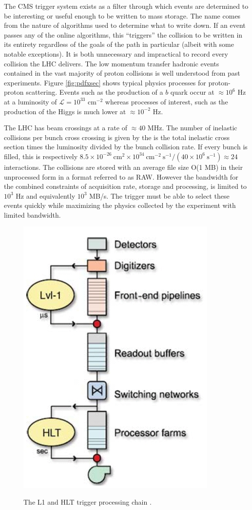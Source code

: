 The CMS trigger system exists as a filter through which events are determined to be interesting or 
useful enough to be written to mass storage. The name comes from the nature of algorithms used to determine 
what to write down. If an event passes any of the online algorithms, this ``triggers'' the collision to be 
written in its entirety regardless of the goals of the path in particular 
 (albeit with some notable exceptions). It is both  unnecessary and impractical to record every
collision the LHC delivers. The low momentum transfer  hadronic events contained in the vast majority of
 proton collisions is well understood from past experiments. Figure \ref{fig:pdfxsec}  shows 
typical physics processes for proton-proton scattering. Events such as the production 
of a $b$ quark  occur at $\approx 10^6$ Hz at a luminosity of $\mathcal{L} = 10^{33}$ cm$^{-2}$ 
whereas processes of interest, such as the production of the Higgs is much lower at $\approx 10^{-2}$ Hz.  

The LHC has beam crossings at a rate of $\approx 40$ MHz. The number of inelastic collisions per bunch cross crossing
 is given by the  is the total inelastic cross section times the luminosity divided by the bunch collision rate. If every bunch is filled, this 
is respectively $8.5\times 10^{-26}~\text{cm}^2 \times 10^{34}~\text{cm}^{-2}~\text{s}^{-1}/ (40 \times 10^6~\text{s}^{-1}) \approx 24$ interactions.
The collisions are stored with an average file size O(1 MB) in their unprocessed 
form in a format referred to as RAW. However the bandwidth for the combined constraints of
 acquisition rate, storage and processing, is limited to $10^3$ Hz and equivalently $10^3$ MB/s. 
The trigger must be able to select these events quickly while maximizing the
 physics collected by the experiment with limited bandwidth.  

\begin{figure}
\begin{center}
\includegraphics[width=.4\textwidth]{figures/exp_proj/cms-trigger}\\
\caption{The L1 and HLT trigger processing chain \cite{tridastdr}.}
\label{fig:l1_hlt_diagram}
\end{center}
\end{figure}

